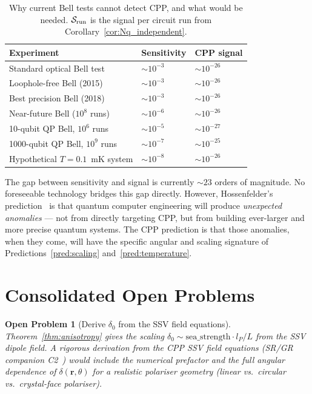 \documentclass[11pt,letterpaper]{article}
\newtheorem{openprob}[theorem]{Open Problem}
\newcommand{\lP}{l_P}
\begin{document}
\begin{table}[H]
\centering
\caption{Why current Bell tests cannot detect CPP, and what
  would be needed.  $\mathcal{S}_{\rm run}$ is the signal per
  circuit run from Corollary~\ref{cor:Nq_independent}.}
\label{tab:sensitivity}
\begin{tabular}{@{}p{4.5cm}p{3cm}p{4.5cm}@{}}
\toprule
Experiment & Sensitivity & CPP signal \\
\midrule
Standard optical Bell test & $\sim 10^{-3}$ & $\sim 10^{-26}$ \\
Loophole-free Bell (2015) & $\sim 10^{-3}$ & $\sim 10^{-26}$ \\
Best precision Bell (2018) & $\sim 10^{-3}$ & $\sim 10^{-26}$ \\
Near-future Bell ($10^8$ runs) & $\sim 10^{-6}$ & $\sim 10^{-26}$ \\
\midrule
10-qubit QP Bell, $10^6$ runs & $\sim 10^{-5}$ & $\sim 10^{-27}$ \\
1000-qubit QP Bell, $10^9$ runs & $\sim 10^{-7}$ & $\sim 10^{-25}$ \\
Hypothetical $T=0.1$~mK system & $\sim 10^{-8}$ & $\sim 10^{-26}$ \\
\bottomrule
\end{tabular}
\end{table}

The gap between sensitivity and signal is currently $\sim 23$
orders of magnitude.  No foreseeable technology bridges this gap
directly.  However, Hossenfelder's prediction~\citep{hossenfelder2024}
is that quantum computer engineering will produce \emph{unexpected
anomalies} --- not from directly targeting CPP, but from building
ever-larger and more precise quantum systems.  The CPP prediction is
that those anomalies, when they come, will have the specific angular
and scaling signature of Predictions~\ref{pred:scaling}
and~\ref{pred:temperature}.

\section{Consolidated Open Problems}

\begin{openprob}[Derive $\delta_0$ from the SSV field equations]
\label{op:delta0}
Theorem~\ref{thm:anisotropy} gives the scaling $\delta_0 \sim
\text{sea\_strength} \cdot \lP/L$ from the SSV dipole field.
A rigorous derivation from the CPP SSV field equations (SR/GR
companion C2~\citep{abshier_sr}) would include the numerical
prefactor and the full angular dependence of
$\delta(\mathbf{r},\theta)$ for a realistic polariser geometry
(linear vs.\ circular vs.\ crystal-face polariser).
\end{openprob}
\end{document}
